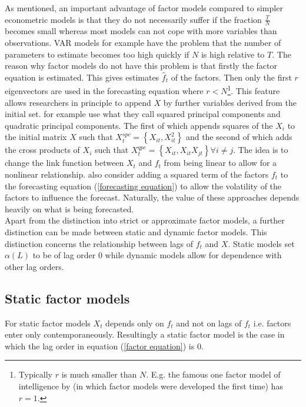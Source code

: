 \documentclass[12pt]{article}
\begin{document}
As mentioned, an important advantage of factor models compared to simpler econometric models is that they do not necessarily suffer if the fraction $\frac{T}{N}$ becomes small whereas most models can not cope with more variables than observations. VAR models for example have the problem that the number of parameters to estimate becomes too high quickly if $N$ is high relative to $T$. 
The reason why factor models do not have this problem is that firstly the factor equation is estimated. This gives estimates $\hat f_t$ of the factors. Then only the first $r$ eigenvectors are used in the forecasting equation where $r<N$\footnote{Typically $r$ is much smaller than $N$. E.g. the famous one factor model of intelligence by \citet{spearman1904general} (in which factor models were developed the first time) has $r=1$.}. This feature allows researchers in principle to append $X$ by further variables derived from the initial set. \citet{bai2008forecasting} for example use what they call squared principal components and quadratic principal components. The first of which appends squares of the $X_i$ to the initial matrix $X$ such that $X_{t}^{spc}=\left\{X_{it}, X_{it}^2\right\}$ and the second of which adds the cross products of $X_i$ such that $X_t^{qpc} = \left\{ X_{it}, X_{it} X_{jt}\right\} \forall i \not= j$. The idea is to change the link function between $X_t$ and $f_t$ from being linear to allow for a nonlinear relationship. \citet{bai2008forecasting} also consider adding a squared term of the factors $f_t$ to the forecasting equation (\ref{forecasting equation}) to allow the volatility of the factors to influence the forecast. Naturally, the value of these approaches depends heavily on what is being forecasted. \\

Apart from the distinction into strict or approximate factor models, a further distinction can be made between static and dynamic factor models. This distinction concerns the relationship between lags of $f_t$ and $X$. Static models set $\alpha(L)$ to be of lag order $0$ while dynamic models allow for dependence with other lag orders.


\subsection{Static factor models}
For static factor models $X_t$ depends only on $f_t$ and not on lags of $f_t$ i.e. factors enter only contemporaneously. Resultingly a static factor model is the case in which the lag order in equation (\ref{factor equation}) is 0.
\end{document}
